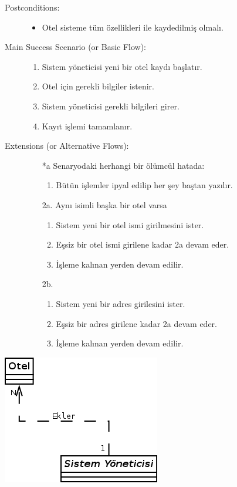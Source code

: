 \documentclass[12pt,a4paper]{report}
\begin{document}
\begin{description}
\item[Postconditions:] \hspace{10mm}
\begin{itemize}
\item Otel sisteme tüm özellikleri ile kaydedilmiş olmalı.
\end{itemize}
\item[Main Success Scenario (or Basic Flow):] \hspace{10mm}
\begin{enumerate}
\item Sistem yöneticisi yeni bir otel kaydı başlatır.
\item Otel için gerekli bilgiler istenir.
\item Sistem yöneticisi gerekli bilgileri girer.
\item Kayıt işlemi tamamlanır.
\end{enumerate}
\item[Extensions (or Alternative Flows):] \hspace{10mm}
\begin{itemize}
\item[*a] Senaryodaki herhangi bir ölümcül hatada:
    \begin{enumerate}
    \item Bütün işlemler ipyal edilip her şey baştan yazılır.
    \end{enumerate}
\item[2a.] Aynı isimli başka bir otel varsa
    \begin{enumerate}
    \item Sistem yeni bir otel ismi girilmesini ister.
    \item Eşsiz bir otel ismi girilene kadar 2a devam eder.
    \item İşleme kalınan yerden devam edilir.
    \end{enumerate}
\item[2b.]
    \begin{enumerate}
    \item Sistem yeni bir adres girilesini ister.
    \item Eşsiz bir adres girilene kadar 2a devam eder.
    \item İşleme kalınan yerden devam edilir.
    \end{enumerate}
\end{itemize}
\end{description}

\begin{center}
\includegraphics{dia/usecase4.png}
\end{center}
\end{document}
